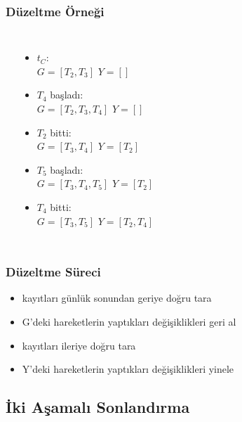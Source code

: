 \documentclass[dvipsnames]{beamer}
\theoremstyle{plain}
\begin{document}
\begin{frame}
  \frametitle{Düzeltme Örneği}

    \begin{columns}[t]
      \begin{center}
      \end{center}

      \pause
      \begin{itemize}
        \item $t_C$:\\
          $G=[T_2,T_3]$
          $Y=[]$

        \pause
        \item $T_4$ başladı:\\
          $G=[T_2,T_3,T_4]$
          $Y=[]$

        \pause
        \item $T_2$ bitti:\\
          $G=[T_3,T_4]$
          $Y=[T_2]$

        \pause
        \item $T_5$ başladı:\\
          $G=[T_3,T_4,T_5]$
          $Y=[T_2]$

        \pause
        \item $T_4$ bitti:\\
          $G=[T_3,T_5]$
          $Y=[T_2,T_4]$
      \end{itemize}
    \end{columns}
\end{frame}

\begin{frame}
  \frametitle{Düzeltme Süreci}

  \begin{itemize}
    \item kayıtları günlük sonundan geriye doğru tara
    \item G'deki hareketlerin yaptıkları değişiklikleri geri al

    \medskip
    \item kayıtları ileriye doğru tara
    \item Y'deki hareketlerin yaptıkları değişiklikleri yinele
  \end{itemize}
\end{frame}

\subsection{İki Aşamalı Sonlandırma}
\end{document}
